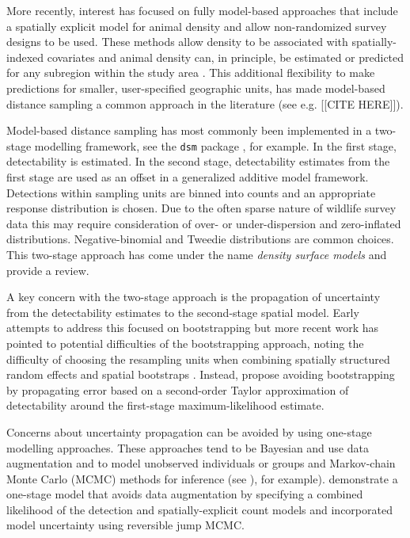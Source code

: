 \documentclass[preprint,12pt]{elsarticle}
\begin{document}
More recently, interest has focused on fully model-based approaches that include a spatially explicit model for animal density and allow non-randomized survey designs to be used.  These methods allow density to be associated with spatially-indexed covariates and animal density can, in principle, be estimated or predicted for any subregion within the study area \citep{johnson_model-based_2010, miller_spatial_2013, buckland_model-based_2016}.  This additional flexibility to make predictions for smaller, user-specified geographic units, has made model-based distance sampling a common approach in the literature (see e.g. [[CITE HERE]]).

Model-based distance sampling has most commonly been implemented in a two-stage modelling framework, see the \texttt{dsm} package \citep{miller_spatial_2013}, for example.  In the first stage, detectability is estimated.  In the second stage, detectability estimates from the first stage are used as an offset in a generalized additive model framework.  Detections within sampling units are binned into counts and an appropriate response distribution is chosen.  Due to the often sparse nature of wildlife survey data this may require consideration of over- or under-dispersion and zero-inflated distributions.  Negative-binomial and Tweedie distributions are common choices.  This two-stage approach has come under the name \textit{density surface models} and \cite{miller_spatial_2013} provide a review.

A key concern with the two-stage approach is the propagation of uncertainty from the detectability estimates to the second-stage spatial model.  Early attempts to address this focused on bootstrapping \citep{lahiri_resampling_2003, hedley_spatial_2004} but more recent work has pointed to potential difficulties of the bootstrapping approach, noting the difficulty of choosing the resampling units when combining spatially structured random effects and spatial bootstraps \citep{bravington_reliable_2018-1}. Instead, \cite{bravington_reliable_2018-1} propose avoiding bootstrapping by propagating error based on a second-order Taylor approximation of detectability around the first-stage maximum-likelihood estimate.

Concerns about uncertainty propagation can be avoided by using one-stage modelling approaches.  These approaches tend to be Bayesian and use data augmentation and to model unobserved individuals or groups and Markov-chain Monte Carlo (MCMC) methods for inference (see )\citep{royle_hierarchical_2008, schmidt_using_2012}, for example).  \cite{oedekoven_bayesian_2014} demonstrate a one-stage model that avoids data augmentation by specifying a combined likelihood of the detection and spatially-explicit count models and incorporated model uncertainty using reversible jump MCMC.  
\end{document}
